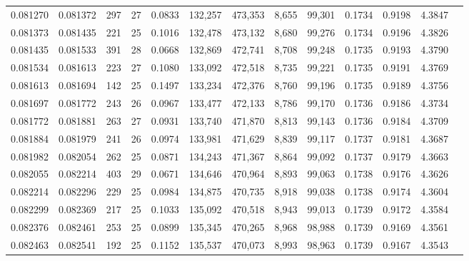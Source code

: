 \begin{tabular}{rrrrrrrrrrrrr}
0.081270 & 0.081372 & 297 &  27 &                                     0.0833 & 132,257 & 473,353 &   8,655 &  99,301 & 0.1734 & 0.9198 & 4.3847 \\
0.081373 & 0.081435 & 221 &  25 &                                     0.1016 & 132,478 & 473,132 &   8,680 &  99,276 & 0.1734 & 0.9196 & 4.3826 \\
0.081435 & 0.081533 & 391 &  28 &                                     0.0668 & 132,869 & 472,741 &   8,708 &  99,248 & 0.1735 & 0.9193 & 4.3790 \\
0.081534 & 0.081613 & 223 &  27 &                                     0.1080 & 133,092 & 472,518 &   8,735 &  99,221 & 0.1735 & 0.9191 & 4.3769 \\
0.081613 & 0.081694 & 142 &  25 &                                     0.1497 & 133,234 & 472,376 &   8,760 &  99,196 & 0.1735 & 0.9189 & 4.3756 \\
0.081697 & 0.081772 & 243 &  26 &                                     0.0967 & 133,477 & 472,133 &   8,786 &  99,170 & 0.1736 & 0.9186 & 4.3734 \\
0.081772 & 0.081881 & 263 &  27 &                                     0.0931 & 133,740 & 471,870 &   8,813 &  99,143 & 0.1736 & 0.9184 & 4.3709 \\
0.081884 & 0.081979 & 241 &  26 &                                     0.0974 & 133,981 & 471,629 &   8,839 &  99,117 & 0.1737 & 0.9181 & 4.3687 \\
0.081982 & 0.082054 & 262 &  25 &                                     0.0871 & 134,243 & 471,367 &   8,864 &  99,092 & 0.1737 & 0.9179 & 4.3663 \\
0.082055 & 0.082214 & 403 &  29 &                                     0.0671 & 134,646 & 470,964 &   8,893 &  99,063 & 0.1738 & 0.9176 & 4.3626 \\
0.082214 & 0.082296 & 229 &  25 &                                     0.0984 & 134,875 & 470,735 &   8,918 &  99,038 & 0.1738 & 0.9174 & 4.3604 \\
0.082299 & 0.082369 & 217 &  25 &                                     0.1033 & 135,092 & 470,518 &   8,943 &  99,013 & 0.1739 & 0.9172 & 4.3584 \\
0.082376 & 0.082461 & 253 &  25 &                                     0.0899 & 135,345 & 470,265 &   8,968 &  98,988 & 0.1739 & 0.9169 & 4.3561 \\
0.082463 & 0.082541 & 192 &  25 &                                     0.1152 & 135,537 & 470,073 &   8,993 &  98,963 & 0.1739 & 0.9167 & 4.3543 \\

\end{tabular}
